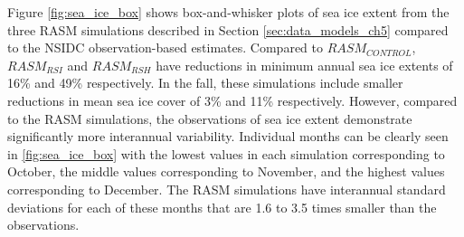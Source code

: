 Figure \ref{fig:sea_ice_box} shows box-and-whisker plots of sea ice extent from the three RASM simulations described in Section \ref{sec:data_models_ch5} compared to the NSIDC observation-based estimates.
Compared to $RASM_{CONTROL}$, $RASM_{RSI}$ and $RASM_{RSH}$ have reductions in minimum annual sea ice extents of 16\% and 49\% respectively.
In the fall, these simulations include smaller reductions in mean sea ice cover of 3\% and 11\% respectively.
However, compared to the RASM simulations, the observations of sea ice extent demonstrate significantly more interannual variability.
Individual months can be clearly seen in \ref{fig:sea_ice_box} with the lowest values in each simulation corresponding to October, the middle values corresponding to November, and the highest values corresponding to December.
The RASM simulations have interannual standard deviations for each of these months that are 1.6 to 3.5 times smaller than the observations.



